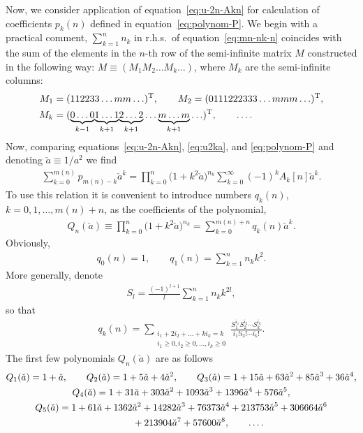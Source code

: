 \documentclass[pdftex]{sigma}
\numberwithin{equation}{section}
\begin{document}
Now, we consider application of equation~\eqref{eq:u-2n-Akn} for calculation of coefficients $p_k(n)$
defined in equation~\eqref{eq:polynom-P}. We begin with a practical comment, $\sum\limits_{k=1}^n n_k$
in r.h.s.\ of equation~\eqref{eq:mn-nk-n} coincides with the sum of the elements in the $n$-th row of the semi-infinite matrix $M$ constructed in the following way:
$M\equiv(M_1M_2\ldots M_k\ldots)$, where $M_k$ are the semi-infinite columns:
\begin{align*}
M_1&=(112233\ldots mm\ldots)^{\rm T},\qquad
M_2=(0111222333\ldots mmm\ldots)^{\rm T},\\
M_k&=(\underset{k-1}{\underbrace{0\ldots0}} \underset{k+1}{\underbrace{1\ldots1}} \underset{k+1}{\underbrace{2\ldots2}} \ldots
\underset{k+1}{\underbrace{m\ldots m}} \ldots)^{\rm T},\qquad\ldots.
\end{align*}
Now, comparing equations~\eqref{eq:u-2n-Akn}, \eqref{eq:u2ka}, and \eqref{eq:polynom-P} and denoting $\check{a}\equiv1/a^2$
we find
\begin{gather}\label{eq:p-k-A-k-generating-equation}
\sum\limits_{k=0}^{m(n)}p_{m(n)-k}\check{a}^k=\prod\limits_{k=0}^n\big(1+k^2\check{a}\big)^{n_k}
\sum\limits_{k=0}^{\infty}(-1)^kA_k[n]\check{a}^{k}.
\end{gather}
To use this relation it is convenient to introduce numbers $q_k(n)$, $k=0,1,\ldots, m(n)+n$, as the coefficients of the
polynomial,
\begin{gather}\label{def-qkn}
Q_n(\check{a})\equiv
\prod\limits_{k=0}^n\big(1+k^2\check{a}\big)^{n_k}=\sum\limits_{k=0}^{m(n)+n}q_k(n)\check{a}^k.
\end{gather}
Obviously,
\begin{gather*}
q_0(n)=1,\qquad
q_1(n)=\sum\limits_{k=1}^{n}n_kk^2.
\end{gather*}
More generally, denote
\begin{gather*}
S_l=\frac{(-1)^{l+1}}{l}\sum\limits_{k=1}^{n}n_kk^{2l},
\end{gather*}
so that
\begin{gather*}
q_k(n)=\sum\limits_{\substack{i_1+2i_2+\dots+ki_k=k\\i_1\geq0,i_2\geq0,\ldots,i_k\geq0}}
\frac{S_1^{i_1}S_2^{i_2}\cdots S_k^{i_k}}{i_1!i_2!\cdots i_k!}.
\end{gather*}
The first few polynomials $Q_n(\check{a})$ are as follows
\begin{gather*}
Q_1(\check{a})=1+\check{a},\qquad
Q_2(\check{a})=1+5\check{a}+4\check{a}^2,\qquad
Q_3(\check{a})=1+15\check{a}+63\check{a}^2+85\check{a}^3+36\check{a}^4, \\
Q_4(\check{a})=1+31\check{a}+303\check{a}^2+1093\check{a}^3+1396\check{a}^4+576\check{a}^5,\\
Q_5(\check{a})=1+61\check{a}+1362\check{a}^2 +14282\check{a}^3+76373\check{a}^4+213753\check{a}^5
+306664\check{a}^6\\
\hphantom{Q_5(\check{a})=}{} +213904\check{a}^7+57600\check{a}^8,\qquad\ldots.
\end{gather*}
\end{document}
